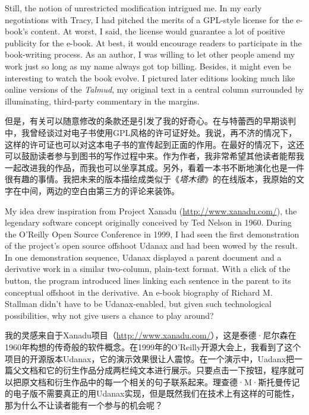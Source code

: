 \ifdefined\eng
Still, the notion of unrestricted modification intrigued me. In my early negotiations with Tracy, I had pitched the merits of a GPL-style license for the e-book's content. At worst, I said, the license would guarantee a lot of positive publicity for the e-book. At best, it would encourage readers to participate in the book-writing process. As an author, I was willing to let other people amend my work just so long as my name always got top billing. Besides, it might even be interesting to watch the book evolve. I pictured later editions looking much like online versions of the \textit{Talmud}, my original text in a central column surrounded by illuminating, third-party commentary in the margins.
\fi

\ifdefined\chs
但是，有关可以随意修改的条款还是引发了我的好奇心。在与特蕾西的早期谈判中，我曾经谈过对电子书使用GPL风格的许可证好处。我说，再不济的情况下，这样的许可证也可以对这本电子书的宣传起到正面的作用。在最好的情况下，这还可以鼓励读者参与到图书的写作过程中来。作为作者，我非常希望其他读者能帮我一起改进我的作品，而我也可以坐享其成。另外，看着一本书不断地演化也是一件很有趣的事情。我把未来的版本描绘成类似于《\textit{塔木德}》的在线版本，我原始的文字在中间，两边的空白由第三方的评论来装饰。
\fi

\ifdefined\eng
My idea drew inspiration from Project Xanadu (\url{http://www.xanadu.com/}), the legendary software concept originally conceived by Ted Nelson in 1960. During the O'Reilly Open Source Conference in 1999, I had seen the first demonstration of the project's \ifdefined\vone open source \fi\ifdefined\vtwo [free] \fi offshoot Udanax and had been wowed by the result. In one demonstration sequence, Udanax displayed a parent document and a derivative work in a similar two-column, plain-text format. With a click of the button, the program introduced lines linking each sentence in the parent to its conceptual offshoot in the derivative. An e-book biography of Richard M. Stallman didn't have to be Udanax-enabled, but given such technological possibilities, why not give users a chance to play around?
\fi

\ifdefined\chs
我的灵感来自于Xanadu项目（\url{http://www.xanadu.com/}），这是泰德·尼尔森在1960年构想的传奇般的软件概念。在1999年的O'Reilly开源大会上，我看到了这个项目的开源版本Udanax，它的演示效果很让人震惊。在一个演示中，Uadanx把一篇父文档和它的衍生作品分成两栏纯文本进行展示。只要点击一下按钮，程序就可以把原文档和衍生作品中的每一个相关的句子联系起来。理查德·M·斯托曼传记的电子版不需要真正的用Udanax实现，但是既然我们在技术上有这样的可能性，那为什么不让读者能有一个参与的机会呢？
\fi

